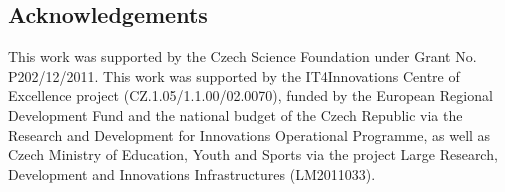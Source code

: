 \documentclass[10pt,a4paper]{article}
\begin{document}
\subsection*{Acknowledgements}

This work was supported by the Czech Science Foundation under Grant No. P202/12/2011.
This work was supported by the IT4Innovations Centre of Excellence project (CZ.1.05/1.1.00/02.0070), funded by the European Regional Development Fund and the national budget of the Czech Republic via the Research and Development for Innovations Operational Programme, as well as Czech Ministry of Education, Youth and Sports via the project Large Research, Development and Innovations Infrastructures (LM2011033).



\end{document}
